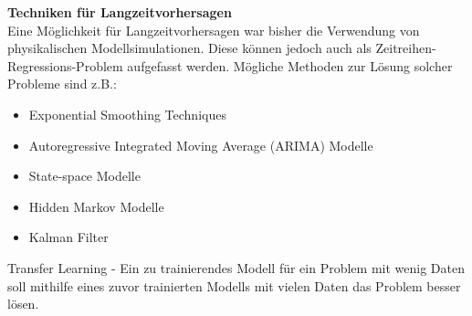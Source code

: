 \documentclass[11pt,fleqn]{book}
\begin{document}
\bigskip
\textbf{Techniken für Langzeitvorhersagen}\\
Eine Möglichkeit für Langzeitvorhersagen war bisher die Verwendung von physikalischen Modellsimulationen. Diese können jedoch auch als Zeitreihen-Regressions-Problem aufgefasst werden. Mögliche Methoden zur Lösung solcher Probleme sind z.B.:
\begin{itemize}
\item Exponential Smoothing Techniques
\item Autoregressive Integrated Moving Average (ARIMA) Modelle
\item State-space Modelle 
\item Hidden Markov Modelle
\item Kalman Filter
\end{itemize}
Transfer Learning - Ein zu trainierendes Modell für ein Problem mit wenig Daten soll mithilfe eines zuvor trainierten Modells mit vielen Daten das Problem besser lösen.\\
\end{document}
